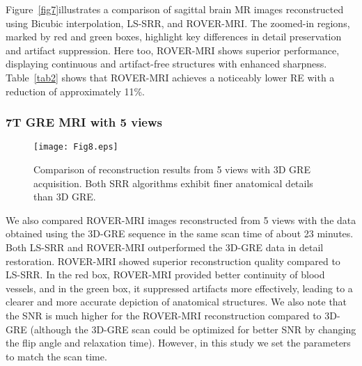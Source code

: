 \documentclass[AMA,STIX2COL]{MRM}
\begin{document}
Figure~\ref{fig7}illustrates a comparison of sagittal brain MR images reconstructed using Bicubic interpolation, LS-SRR, and ROVER-MRI. The zoomed-in regions, marked by red and green boxes, highlight key differences in detail preservation and artifact suppression. %
Here too, ROVER-MRI shows superior performance, displaying continuous and artifact-free structures with enhanced sharpness. Table~\ref{tab2} shows that ROVER-MRI achieves a noticeably lower RE with a reduction of approximately 11\%.%

\subsubsection{7T GRE MRI with 5 views}
\begin{figure}[t]
\centerline{\texttt{[image: Fig8.eps]}}
\caption{Comparison of reconstruction results from 5 views with 3D GRE acquisition. Both SRR algorithms exhibit finer anatomical details than 3D GRE.}\label{fig8}
\end{figure}
We also compared ROVER-MRI images reconstructed from 5 views with the data obtained using the 3D-GRE sequence in the same scan time of about 23 minutes. Both LS-SRR and ROVER-MRI outperformed the 3D-GRE data in detail restoration. ROVER-MRI showed superior reconstruction quality compared to LS-SRR. In the red box, ROVER-MRI provided better continuity of blood vessels, and in the green box, it suppressed artifacts more effectively, leading to a clearer and more accurate depiction of anatomical structures. We also note that the SNR is much higher for the ROVER-MRI reconstruction compared to 3D-GRE (although the 3D-GRE scan could be optimized for better SNR by changing the flip angle and relaxation time). However, in this study we set the parameters to match the scan time.
\end{document}
